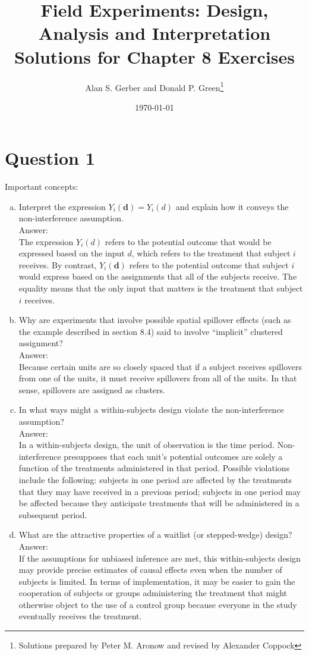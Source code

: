 \documentclass[11pt,notitlepage]{article}\usepackage[]{graphicx}\usepackage[]{color}
\title{Field Experiments: Design, Analysis and Interpretation \\
Solutions for Chapter 8 Exercises}
\author{Alan S. Gerber and Donald P. Green\footnote{Solutions prepared by Peter M. Aronow and revised by Alexander Coppock}}
\date{\today}
\begin{document}
\maketitle

\section*{Question 1}
Important concepts:
\begin{enumerate}[a)]
\item Interpret the expression $Y_i(\mathbf{d}) = Y_i(d)$ and explain how it conveys the non-interference assumption.\\
Answer:\\
The expression $Y_i(d)$ refers to the potential outcome that would be expressed based on the input $d$, which refers to the treatment that subject $i$ receives.  By contrast, $Y_i(\mathbf{d})$ refers to the potential outcome that subject $i$ would express based on the assignments that all of the subjects receive. The equality means that the only input that matters is the treatment that subject $i$ receives. 

\item Why are experiments that involve possible spatial spillover effects (such as the example described in section 8.4) said to involve ``implicit'' clustered assignment?\\
Answer:\\
Because certain units are so closely spaced that if a subject receives spillovers from one of the units, it must receive spillovers from all of the units. In that sense, spillovers are assigned as clusters.

\item In what ways might a within-subjects design violate the non-interference assumption?\\
Answer:\\
In a within-subjects design, the unit of observation is the time period. Non-interference presupposes that each unit's potential outcomes are solely a function of the treatments administered in that period. Possible violations include the following: subjects in one period are affected by the treatments that they may have received in a previous period; subjects in one period may be affected because they anticipate treatments that will be administered in a subsequent period.  

\item What are the attractive properties of a waitlist (or stepped-wedge) design?\\
Answer:\\
If the assumptions for unbiased inference are met, this within-subjects design may provide precise estimates of causal effects even when the number of subjects is limited. In terms of implementation, it may be easier to gain the cooperation of subjects or groups administering the treatment that might otherwise object to the use of a control group because everyone in the study eventually receives the treatment.
\end{enumerate}
\end{document}
